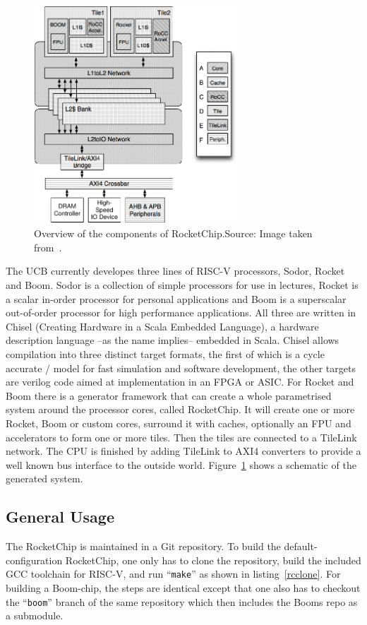 \documentclass[journal,a4paper]{IEEEtran}
\newcommand{\source}[1]{Source: #1}
\begin{document}
\begin{figure}[!t]
	\centering
	\includegraphics[width=3in]{rcov}
	\caption{Overview of the components of RocketChip.\newline\hspace{\linewidth}\source{Image taken from~\cite{rcgen}}.}
	\label{rcov}
\end{figure}
The UCB currently developes three lines of RISC-V processors, Sodor, Rocket and Boom.
Sodor is a collection of simple processors for use in lectures, Rocket is a scalar in-order processor for personal applications and Boom is a superscalar out-of-order processor for high performance applications.
All three are written in Chisel (Creating Hardware in a Scala Embedded Language), a hardware description language --as the name implies-- embedded in Scala.
Chisel allows compilation into three distinct target formats, the first of which is a cycle accurate \CC/ model for fast simulation and software development, the other targets are verilog code aimed at implementation in an FPGA or ASIC\@.
For Rocket and Boom there is a generator framework that can create a whole parametrised system around the processor cores, called RocketChip.
It will create one or more Rocket, Boom or custom cores, surround it with caches, optionally an FPU and accelerators to form one or more tiles. Then the tiles are connected to a TileLink network. The CPU is finished by adding TileLink to AXI4 converters to provide a well known bus interface to the outside world. Figure~\ref{rcov} shows a schematic of the generated system.


\subsection{General Usage}
The RocketChip is maintained in a Git repository.
To build the default-configuration RocketChip, one only has to clone the repository, build the included GCC toolchain for RISC-V, and run ``\texttt{make}'' as shown in listing~\ref{rcclone}. For building a Boom-chip, the steps are identical except that one also has to checkout the ``\texttt{boom}'' branch of the same repository which then includes the Booms repo as a submodule.
\end{document}
